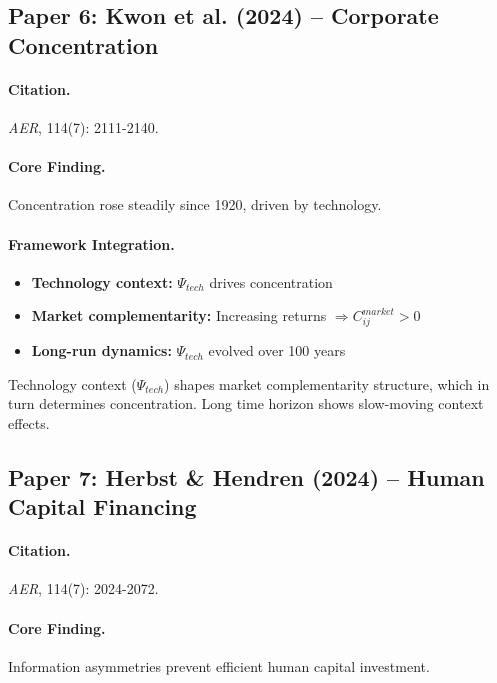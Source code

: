 \subsection{Paper 6: Kwon et al. (2024) -- Corporate Concentration}

\paragraph{Citation.}
\emph{AER}, 114(7): 2111-2140.

\paragraph{Core Finding.}
Concentration rose steadily since 1920, driven by technology.

\paragraph{Framework Integration.}
\begin{itemize}
  \item \textbf{Technology context:} $\Psi_{tech}$ drives concentration
  \item \textbf{Market complementarity:} Increasing returns $\Rightarrow C_{ij}^{market} > 0$
  \item \textbf{Long-run dynamics:} $\Psi_{tech}$ evolved over 100 years
\end{itemize}

\begin{tcolorbox}[colback=yellow!5!white, colframe=yellow!75!black,
    title=EBF Insight: Market Structure]
Technology context ($\Psi_{tech}$) shapes market complementarity structure,
which in turn determines concentration. Long time horizon shows slow-moving
context effects.
\end{tcolorbox}


\subsection{Paper 7: Herbst \& Hendren (2024) -- Human Capital Financing}

\paragraph{Citation.}
\emph{AER}, 114(7): 2024-2072.

\paragraph{Core Finding.}
Information asymmetries prevent efficient human capital investment.

